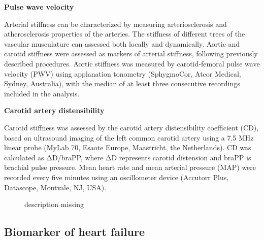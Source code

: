 \documentclass[
  a4paper,
  headsepline=true,
  open=any]{scrbook}
\begin{document}
\textbf{Pulse wave velocity}

Arterial stiffness can be characterized by measuring arteriosclerosis
and atherosclerosis properties of the arteries. The stiffness of
different trees of the vascular musculature can assessed both locally
and dynamically. Aortic and carotid stiffness were assessed as markers
of arterial stiffness, following previously described procedures. Aortic
stiffness was measured by carotid-femoral pulse wave velocity (PWV)
using applanation tonometry (SphygmoCor, Atcor Medical, Sydney,
Australia), with the median of at least three consecutive recordings
included in the analysis.

\textbf{Carotid artery distensibility}

Carotid stiffness was assessed by the carotid artery distensibility
coefficient (CD), based on ultrasound imaging of the left common carotid
artery using a 7.5 MHz linear probe (MyLab 70, Esaote Europe,
Maastricht, the Netherlands). CD was calculated as ΔD/braPP, where ΔD
represents carotid distension and braPP is brachial pulse pressure. Mean
heart rate and mean arterial pressure (MAP) were recorded every five
minutes using an oscillometer device (Accutorr Plus, Datascope,
Montvale, NJ, USA).

\begin{figure}

\begin{minipage}[t]{\linewidth}

{\centering 


\caption{description missing}

}

\end{minipage}%

\end{figure}

\hypertarget{biomarker-of-heart-failure}{%
\subsection{Biomarker of heart
failure}\label{biomarker-of-heart-failure}}
\end{document}
